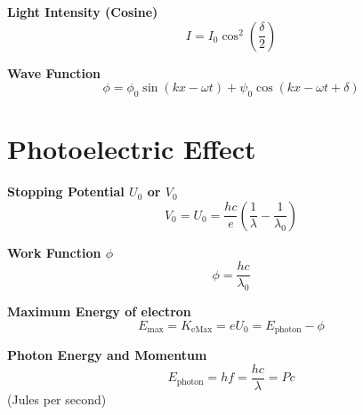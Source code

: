 \documentclass[a4paper,11pt]{article}
\renewcommand{\textbf}[1]{{\scriptsize	\bfseries #1}}
\begin{document}
\begin{footnotesize}
\begin{multicols}{2}
\begin{minipage}{\linewidth}
\end{minipage}

\begin{minipage}{\linewidth}

\textbf{Light Intensity (Cosine)} \\[-0.2cm]
\[
I = I_0 \cos^2\left( \frac{\delta}{2} \right)
\]

\end{minipage}

\begin{minipage}{\linewidth}

\textbf{Wave Function} \\[-0.2cm]
\[
\phi = \phi_0 \sin(kx - \omega t) + \psi_0 \cos(kx - \omega t + \delta)
\]

\end{minipage}



\section*{Photoelectric Effect}

\begin{minipage}{\linewidth}

\textbf{Stopping Potential $U_0$ or $V_0$} \\[-0.2cm]
\[
V_0 = U_0 = \frac{hc}{e} \left( \frac{1}{\lambda} - \frac{1}{\lambda_0} \right)
\]

\end{minipage}

\begin{minipage}{\linewidth}

\textbf{Work Function $\phi$} \\[-0.2cm]
\[
\phi = \frac{hc}{\lambda_0}
\]

\end{minipage}

\begin{minipage}{\linewidth}
\textbf{Maximum Energy of electron} \\[-0.2cm]
\[
E_{\text{max}}  = K_{\text{eMax}} = eU_0 = E_{\text{photon}} - \phi
\]
\end{minipage}

\begin{minipage}{\linewidth}

\textbf{Photon Energy and Momentum} \\[-0.2cm]
\[
E_{\text{photon}} = hf = \frac{hc}{\lambda} =Pc 
\]
(Jules per second)
\end{minipage}


\end{multicols}
\end{footnotesize}
\end{document}
